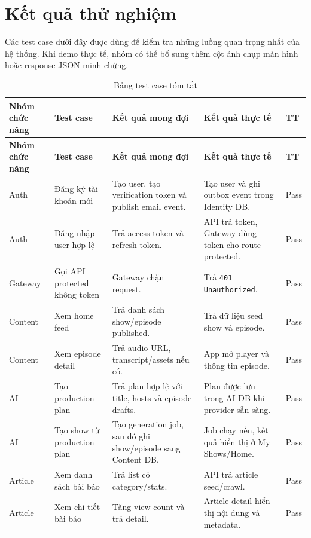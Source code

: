 \documentclass[14pt,a4paper,oneside]{extreport}
\begin{document}
\section{Kết quả thử nghiệm}
\label{sec:ket-qua-thu-nghiem}

Các test case dưới đây được dùng để kiểm tra những luồng quan trọng nhất của hệ thống. Khi demo thực tế, nhóm có thể bổ sung thêm cột ảnh chụp màn hình hoặc response JSON minh chứng.

\begin{longtable}{|p{2.8cm}|p{4.0cm}|p{4.3cm}|p{3.0cm}|p{1.6cm}|}
\caption{Bảng test case tóm tắt}
\label{tab:test-case}\\
\hline
\textbf{Nhóm chức năng} & \textbf{Test case} & \textbf{Kết quả mong đợi} & \textbf{Kết quả thực tế} & \textbf{TT} \\
\hline
\endfirsthead
\hline
\textbf{Nhóm chức năng} & \textbf{Test case} & \textbf{Kết quả mong đợi} & \textbf{Kết quả thực tế} & \textbf{TT} \\
\hline
\endhead
Auth & Đăng ký tài khoản mới & Tạo user, tạo verification token và publish email event. & Tạo user và ghi outbox event trong Identity DB. & Pass \\
\hline
Auth & Đăng nhập user hợp lệ & Trả access token và refresh token. & API trả token, Gateway dùng token cho route protected. & Pass \\
\hline
Gateway & Gọi API protected không token & Gateway chặn request. & Trả \texttt{401 Unauthorized}. & Pass \\
\hline
Content & Xem home feed & Trả danh sách show/episode published. & Trả dữ liệu seed show và episode. & Pass \\
\hline
Content & Xem episode detail & Trả audio URL, transcript/assets nếu có. & App mở player và thông tin episode. & Pass \\
\hline
AI & Tạo production plan & Trả plan hợp lệ với title, hosts và episode drafts. & Plan được lưu trong AI DB khi provider sẵn sàng. & Pass \\
\hline
AI & Tạo show từ production plan & Tạo generation job, sau đó ghi show/episode sang Content DB. & Job chạy nền, kết quả hiển thị ở My Shows/Home. & Pass \\
\hline
Article & Xem danh sách bài báo & Trả list có category/stats. & API trả article seed/crawl. & Pass \\
\hline
Article & Xem chi tiết bài báo & Tăng view count và trả detail. & Article detail hiển thị nội dung và metadata. & Pass \\

\end{longtable}
\end{document}
